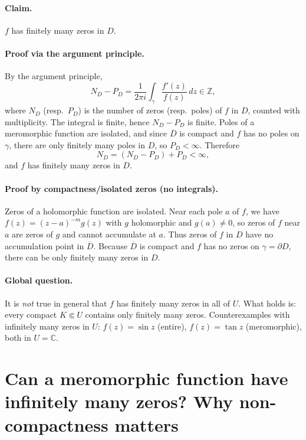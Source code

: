 \documentclass[12pt,a4paper]{article}
\newcommand{\C}{\mathbb{C}}
\begin{document}
\paragraph{Claim.} \(f\) has finitely many zeros in \(D\).

\paragraph{Proof via the argument principle.}
By the argument principle,
\[
N_D-P_D=\frac{1}{2\pi i}\int_{\gamma}\frac{f'(z)}{f(z)}\,dz\in\mathbb{Z},
\]
where \(N_D\) (resp.\ \(P_D\)) is the number of zeros (resp.\ poles) of \(f\) in \(D\),
counted with multiplicity. The integral is finite, hence \(N_D-P_D\) is finite.
Poles of a meromorphic function are isolated, and since \(\overline{D}\) is compact
and \(f\) has no poles on \(\gamma\), there are only finitely many poles in \(D\),
so \(P_D<\infty\). Therefore
\[
N_D=(N_D-P_D)+P_D<\infty,
\]
and \(f\) has finitely many zeros in \(D\).

\paragraph{Proof by compactness/isolated zeros (no integrals).}
Zeros of a holomorphic function are isolated. Near each pole \(a\) of \(f\),
we have \(f(z)=(z-a)^{-m}g(z)\) with \(g\) holomorphic and \(g(a)\ne0\), so zeros of
\(f\) near \(a\) are zeros of \(g\) and cannot accumulate at \(a\).
Thus zeros of \(f\) in \(D\) have no accumulation point in \(\overline{D}\).
Because \(\overline{D}\) is compact and \(f\) has no zeros on \(\gamma=\partial D\),
there can be only finitely many zeros in \(D\).

\paragraph{Global question.}
It is \emph{not} true in general that \(f\) has finitely many zeros in all of \(U\).
What holds is: every compact \(K\Subset U\) contains only finitely many zeros.
Counterexamples with infinitely many zeros in \(U\): \(f(z)=\sin z\) (entire),
\(f(z)=\tan z\) (meromorphic), both in \(U=\C\).
\qedhere


\section*{Can a meromorphic function have infinitely many zeros?  Why non-compactness matters}
\end{document}
